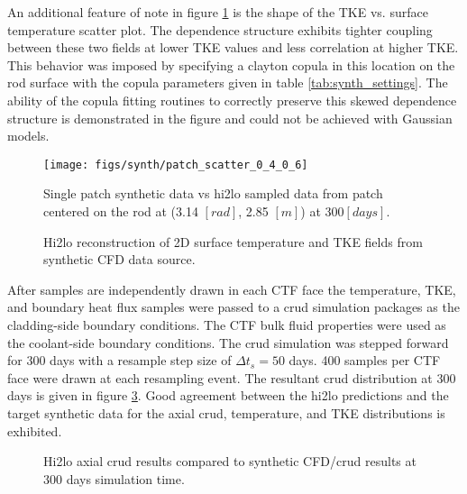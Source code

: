 An additional feature of note in figure  \ref{fig:patchscatter} is the shape of the TKE vs. surface temperature scatter plot.  The dependence structure exhibits tighter coupling between these two fields at lower TKE values and less correlation at higher TKE.  This behavior was imposed by specifying a clayton copula in this location on the rod surface with the copula parameters given in table \ref{tab:synth_settings}.  The ability of the copula fitting routines to correctly preserve this skewed dependence structure is demonstrated in the figure and could not be achieved with Gaussian models.

\begin{figure}[H]
    \centering
    \texttt{[image: figs/synth/patch\_scatter\_0\_4\_0\_6]}
    \caption[Single patch synthetic CFD data vs hi2lo sampled data.]{Single patch synthetic data vs hi2lo sampled data from patch centered on the rod at (3.14 $[rad]$, 2.85 $[m]$) at 300$[days]$.}
    \label{fig:patchscatter}
\end{figure}

\begin{figure}[H]%
    \centering
    \qquad
    \caption{Hi2lo reconstruction of 2D surface temperature and TKE fields from synthetic CFD data source. }%
    \label{fig:hi2lo_tke_t}%
\end{figure}


After samples are independently drawn in each CTF face the temperature, TKE, and boundary heat flux samples were passed to a crud simulation packages as the cladding-side boundary conditions.  The CTF bulk fluid properties were used as the coolant-side boundary conditions.  The crud simulation was stepped forward for 300 days with a resample step size of $\Delta t_s =50$ days.  400 samples per CTF face were drawn at each resampling event. The resultant crud distribution at 300 days is given in figure \ref{fig:hi2lopincmass}.  Good agreement between the hi2lo predictions and the target synthetic data for the axial crud, temperature, and TKE distributions is exhibited.

\begin{figure}[H]%
    \centering
    \qquad
    \caption{Hi2lo axial crud results compared to synthetic CFD/crud results at 300 days simulation time. }%
    \label{fig:hi2lopincmass}%
\end{figure}


